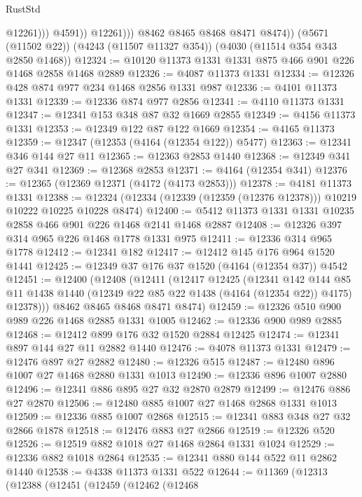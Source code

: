 \begin{lexlean}{RustStd}
\begin{coremodule}
                        @12261)))
                  @4591))
              @12261)))
        @8462
        @8465
        @8468
        @8471
        @8474))
    (@5671 (@11502 @22))
    (@4243 (@11507 @11327 @354))
    (@4030 (@11514 @354 @343 @2850 @1468))
@12324 := @10120 @11373 @1331 @1331 @875 @466 @901 @226 @1468 @2858 @1468 @2889
@12326 := @4087 @11373 @1331
@12334 := @12326 @428 @874 @977 @234 @1468 @2856 @1331 @987
@12336 := @4101 @11373 @1331
@12339 := @12336 @874 @977 @2856
@12341 := @4110 @11373 @1331
@12347 := @12341 @153 @348 @87 @32 @1669 @2855
@12349 := @4156 @11373 @1331
@12353 := @12349 @122 @87 @122 @1669
@12354 := @4165 @11373
@12359 := @12347 (@12353 (@4164 (@12354 @122)) @5477)
@12363 := @12341 @346 @144 @27 @11
@12365 := @12363 @2853 @1440
@12368 := @12349 @341 @27 @341
@12369 := @12368 @2853
@12371 := @4164 (@12354 @341)
@12376 := @12365 (@12369 @12371 (@4172 (@4173 @2853)))
@12378 := @4181 @11373 @1331
@12388 := @12324 (@12334 (@12339 (@12359 (@12376 @12378))) @10219 @10222 @10225 @10228 @8474)
@12400 := @5412 @11373 @1331 @1331 @10235 @2858 @466 @901 @226 @1468 @2141 @1468 @2887
@12408 := @12326 @397 @314 @965 @226 @1468 @1778 @1331 @975
@12411 := @12336 @314 @965 @1778
@12412 := @12341 @182
@12417 := @12412 @145 @176 @964 @1520 @1441
@12425 := @12349 @37 @176 @37 @1520 (@4164 (@12354 @37)) @4542
@12451 := @12400
    (@12408
      (@12411
        (@12417
          @12425
          (@12341
            @142
            @144
            @85
            @11
            @1438
            @1440
            (@12349 @22 @85 @22 @1438 (@4164 (@12354 @22)) @4175)
            @12378)))
      @8462
      @8465
      @8468
      @8471
      @8474)
@12459 := @12326 @510 @900 @989 @226 @1468 @2885 @1331 @1005
@12462 := @12336 @900 @989 @2885
@12468 := @12412 @899 @176 @32 @1520 @2884 @12425
@12474 := @12341 @897 @144 @27 @11 @2882 @1440
@12476 := @4078 @11373 @1331
@12479 := @12476 @897 @27 @2882
@12480 := @12326 @515
@12487 := @12480 @896 @1007 @27 @1468 @2880 @1331 @1013
@12490 := @12336 @896 @1007 @2880
@12496 := @12341 @886 @895 @27 @32 @2870 @2879
@12499 := @12476 @886 @27 @2870
@12506 := @12480 @885 @1007 @27 @1468 @2868 @1331 @1013
@12509 := @12336 @885 @1007 @2868
@12515 := @12341 @883 @348 @27 @32 @2866 @1878
@12518 := @12476 @883 @27 @2866
@12519 := @12326 @520
@12526 := @12519 @882 @1018 @27 @1468 @2864 @1331 @1024
@12529 := @12336 @882 @1018 @2864
@12535 := @12341 @880 @144 @522 @11 @2862 @1440
@12538 := @4338 @11373 @1331 @522
@12644 := @11369
    (@12313
      (@12388
        (@12451
          (@12459
            (@12462
              (@12468

\end{coremodule}
\end{lexlean}
